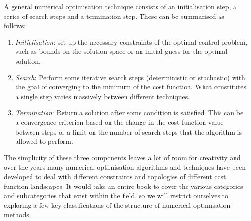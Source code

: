 A general numerical optimisation technique consists of an initialisation step, a series of search steps and a termination step. These can be summarised as follows:
\begin{enumerate}
    \item \emph{Initialisation}: set up the necessary constraints of the optimal control problem, such as bounds on the solution space or an initial guess for the optimal solution.
    \item \emph{Search}: Perform some iterative search steps (deterministic or stochastic) with the goal of converging to the minimum of the cost function. What constitutes a single step varies massively between different techniques.
    \item \emph{Termination}: Return a solution after some condition is satisfied. This can be a convergence criterion based on the change in the cost function value between steps or a limit on the number of search steps that the algorithm is allowed to perform.
\end{enumerate}

The simplicity of these three components leaves a lot of room for creativity and over the years many numerical optimisation algorithms and techniques have been developed to deal with different constraints and topologies of different cost function landscapes. It would take an entire book \cite{nocedal_numerical_2006} to cover the various categories and subcategories that exist within the field, so we will restrict ourselves to exploring a few key classifications of the structure of numerical optimisation methods. 

